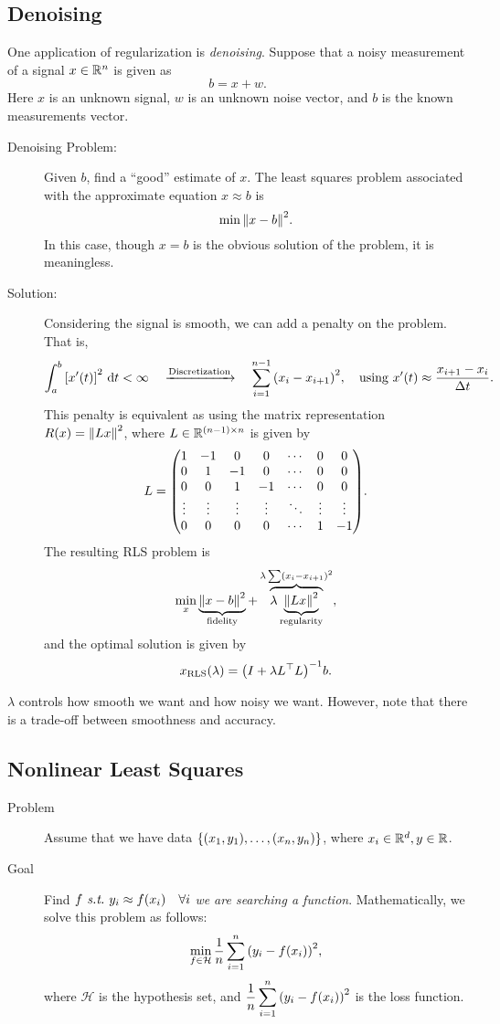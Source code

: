 \subsection{Denoising}
One application of regularization is \textit{denoising}. Suppose that a noisy measurement of a signal $x\in{\mathbb{R}}^n$ is given as \[b=x+w.\] Here $x$ is an unknown signal, $w$ is an unknown noise vector, and $b$ is the known measurements vector.
\begin{description}
	\item[Denoising Problem:] Given $b$, find a ``good'' estimate of $x$. The least squares problem associated with the approximate equation $x\approx b$ is \[\min\norm{x-b}^2.\] In this case, though $x=b$ is the obvious solution of the problem, it is meaningless. 
	\item[Solution:] Considering the signal is smooth, we can add a penalty on the problem. That is, \[\int_a^b\qty[x'(t)]^2\ \d{t}<\infty\quad\xrightarrow{\text{Discretization}}\quad\sum_{i=1}^{n-1}\qty(x_i-x_{i+1})^2,\quad\text{using }x'(t)\approx\dfrac{x_{i+1}-x_i}{\Delta t}.\] This penalty is equivalent as using the matrix representation $R(x)=\norm{Lx}^2$, where $L\in{\mathbb{R}}^{(n-1)\times n}$ is given by \[L=\mqty(1&-1&0&0&\cdots&0&0\\0&1&-1&0&\cdots&0&0\\0&0&1&-1&\cdots&0&0\\\vdots&\vdots&\vdots&\vdots&\ddots&\vdots&\vdots\\0&0&0&0&\cdots&1&-1).\] The resulting RLS problem is \[\min_x\underbrace{\norm{x-b}^2}_\text{fidelity}+\overbrace{\lambda\underbrace{\norm{Lx}^2}_\text{regularity}}^{\lambda\sum(x_i-x_{i+1})^2},\] and the optimal solution is given by \[x_\text{RLS}(\lambda)=\qty(I+\lambda L^\top L)^{-1}b.\]
\end{description}
\begin{rmk}
	$\lambda$ controls how smooth we want and how noisy we want. However, note that there is a trade-off between smoothness and accuracy. 	
\end{rmk}

\subsection{Nonlinear Least Squares}
\begin{description}
	\item[Problem] Assume that we have data $\qty{(x_1,y_1),\dots,(x_n,y_n)}$, where $x_i\in{\mathbb{R}}^d, y\in{\mathbb{R}}$. 
	\item[Goal] Find $f\emph{\ s.t.\ } y_i\approx f(x_i)\quad\forall i$ \textit{we are searching a function}. Mathematically, we solve this problem as follows: \begin{equation}\label{eq4}\min_{f\in\mathcal{H}}\dfrac{1}{n}\sum_{i=1}^n\qty(y_i-f(x_i))^2,\end{equation} where $\mathcal{H}$ is the hypothesis set, and $\displaystyle \dfrac{1}{n}\sum_{i=1}^n\qty(y_i-f(x_i))^2$ is the loss function. 
\end{description}
